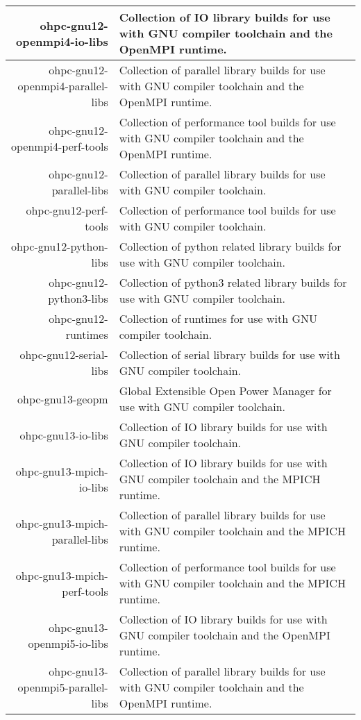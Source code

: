 \begin{tabularx}{\textwidth}{r|X}
\hline
ohpc-gnu12-openmpi4-io-libs & Collection of IO library builds for use with GNU compiler toolchain and the OpenMPI runtime. \\
\hline
ohpc-gnu12-openmpi4-parallel-libs & Collection of parallel library builds for use with GNU compiler toolchain and the OpenMPI runtime. \\
\hline
ohpc-gnu12-openmpi4-perf-tools & Collection of performance tool builds for use with GNU compiler toolchain and the OpenMPI runtime. \\
\hline
ohpc-gnu12-parallel-libs & Collection of parallel library builds for use with GNU compiler toolchain. \\
\hline
ohpc-gnu12-perf-tools & Collection of performance tool builds for use with GNU compiler toolchain. \\
\hline
ohpc-gnu12-python-libs & Collection of python related library builds for use with GNU compiler toolchain. \\
\hline
ohpc-gnu12-python3-libs & Collection of python3 related library builds for use with GNU compiler toolchain. \\
\hline
ohpc-gnu12-runtimes & Collection of runtimes for use with GNU compiler toolchain. \\
\hline
ohpc-gnu12-serial-libs & Collection of serial library builds for use with GNU compiler toolchain. \\
\hline
ohpc-gnu13-geopm & Global Extensible Open Power Manager for use with GNU compiler toolchain. \\
\hline
ohpc-gnu13-io-libs & Collection of IO library builds for use with GNU compiler toolchain. \\
\hline
ohpc-gnu13-mpich-io-libs & Collection of IO library builds for use with GNU compiler toolchain and the MPICH runtime. \\
\hline
ohpc-gnu13-mpich-parallel-libs & Collection of parallel library builds for use with GNU compiler toolchain and the MPICH runtime. \\
\hline
ohpc-gnu13-mpich-perf-tools & Collection of performance tool builds for use with GNU compiler toolchain and the MPICH runtime. \\
\hline
ohpc-gnu13-openmpi5-io-libs & Collection of IO library builds for use with GNU compiler toolchain and the OpenMPI runtime. \\
\hline
ohpc-gnu13-openmpi5-parallel-libs & Collection of parallel library builds for use with GNU compiler toolchain and the OpenMPI runtime. \\

\end{tabularx}
